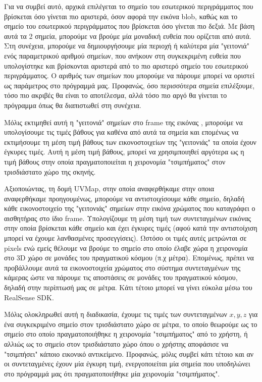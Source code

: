 Για να συμβεί αυτό, αρχικά επιλέγεται το σημείο του εσωτερικού περιγράμματος που βρίσκεται όσο γίνεται πιο αριστερά, όσον αφορά την εικόνα blob, καθώς και το σημείο του εσωτερικού περιγράμματος που βρίσκεται όσο γίνεται πιο δεξιά. Με βάση αυτά τα 2 σημεία, μπορούμε να βρούμε μία μοναδική ευθεία που ορίζεται από αυτά. Στη συνέχεια, μπορούμε να δημιουργήσουμε μία περιοχή ή καλύτερα μία "γειτονιά"  ενός παραμετρικού αριθμού σημείων, που ανήκουν στη συγκεκριμένη ευθεία που υπολογίστηκε και βρίσκονται αριστερά από το πιο αριστερό σημείο του εσωτερικού περιγράμματος.  Ο αριθμός των σημείων που μπορούμε να πάρουμε μπορεί να οριστεί ως παράμετρος στο πρόγραμμά μας. Προφανώς, όσο περισσότερα σημεία επιλέξουμε, τόσο πιο ακριβές θα είναι το αποτέλεσμα, αλλά τόσο πιο αργό θα γίνεται το πρόγραμμα όπως θα διαπιστωθεί στη συνέχεια. 


Μόλις εκτιμηθεί αυτή η "γειτονιά" σημείων στο frame της εικόνας , μπορούμε να υπολογίσουμε τις τιμές βάθους για καθένα από αυτά τα σημεία και επομένως να εκτιμήσουμε τη μέση τιμή βάθους των εικονοστοιχείων της "γειτονιάς" τα οποία έχουν έγκυρες τιμές. Αυτή η μέση τιμή βάθους, μπορεί να χρησιμποιηθεί αργότερα ως η τιμή βάθους στην οποία πραγματοποιείται η χειρονομία "τσιμπήματος" στον τρισδιάστατο χώρο της σκηνής. 

Αξιοποιώντας, τη δομή UVMap, στην οποία αναφερθήκαμε στην οποια αναφερθήκαμε προηγουμένως, μπορούμε να αντιστοιχίσουμε κάθε σημείο, δηλαδή κάθε εικονοστοιχείο της "γειτονιάς" σημείων στην εικόνα χρώματος που καταγράφει ο αισθητήρας στο ίδιο frame. Υπολογίζουμε τη μέση τιμή των συντεταγμένων εικόνας στην οποία βρίσκεται κάθε σημείο και έχει έγκυρες τιμές (αφού κατά την αντιστοίχιση μπορεί να έχουμε λανθασμένες προσεγγίσεις). Ωστόσο οι τιμές αυτές μετρώνται σε pixels ενώ εμείς θέλουμε να βρούμε το σημείο στο οποίο έλαβε χώρα η χειρονομία στο 3D χώρο σε μονάδες του πραγματικού κόσμου (π.χ μέτρα). Επομένως, πρέπει να προβάλλουμε αυτά τα εικονοστοιχεία χρώματος στο σύστημα συντεταγμένων της κάμερας ώστε να πάρουμε τις αποστάσεις σε μονάδες του πραγματικού κόσμου, δηλαδή στην περίπτωσή μας σε μέτρα. Κάτι τέτοιο μπορεί να γίνει εύκολα μέσω του RealSense SDK.


Μόλις ολοκληρωθεί αυτή η διαδικασία, έχουμε τις τιμές των συντεταγμένων $x,y,z$ για ένα συγκεκριμένο σημείο στον τρισδιάστατο χώρο σε μέτρα, το οποίο θεωρούμε ως το σημείο στο οποίο πραγματοποιήθηκε η χειρονομία "τσιμπήματος" από το χρήστη, ή αλλιώς ως το σημείο στον τρισδιάστατο χώρο όπου ο χρήστης αποφάσισε να "τσιμπήσει" κάποιο εικονικό αντικείμενο. Προφανώς, μόλις συμβεί κάτι τέτοιο και αν οι συντεταγμένες έχουν μία έγκυρη τιμή, ενεργοποιείται μία σημεία που υποδηλώνει στο πρόγραμμά μας ότι πραγματοποιήθηκε μία χειρονομία "τσιμπήματος". 

